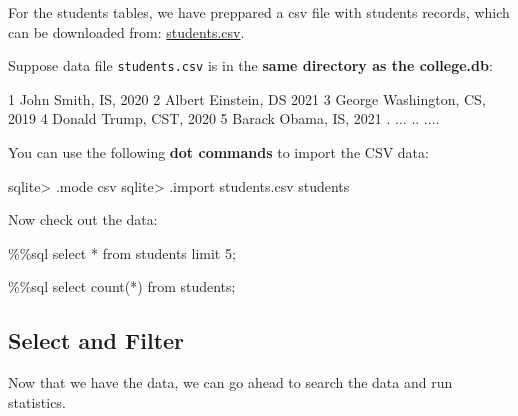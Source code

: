 \documentclass[
  letterpaper,
]{scrbook}
\newenvironment{Shaded}{\begin{snugshade}}{\end{snugshade}}
\newcommand{\DecValTok}[1]{\textcolor[rgb]{0.68,0.00,0.00}{#1}}
\newcommand{\ImportTok}[1]{\textcolor[rgb]{0.00,0.46,0.62}{#1}}
\newcommand{\NormalTok}[1]{\textcolor[rgb]{0.00,0.23,0.31}{#1}}
\newcommand{\OperatorTok}[1]{\textcolor[rgb]{0.37,0.37,0.37}{#1}}
\begin{document}
For the students tables, we have preppared a csv file with students
records, which can be downloaded from:
\href{data/students.csv}{students.csv}.

Suppose data file \texttt{students.csv} is in the \textbf{same directory
as the college.db}:

\begin{Shaded}
\begin{Highlighting}[]
\NormalTok{1   John Smith,        IS,  2020}
\NormalTok{2   Albert Einstein,   DS   2021}
\NormalTok{3   George Washington, CS,  2019}
\NormalTok{4   Donald Trump,      CST, 2020}
\NormalTok{5   Barack Obama,      IS,  2021}
\NormalTok{.   ...                ..   ....}
\end{Highlighting}
\end{Shaded}

You can use the following \textbf{dot commands} to import the CSV data:

\begin{Shaded}
\begin{Highlighting}[]
\NormalTok{sqlite\textgreater{} .mode csv}
\NormalTok{sqlite\textgreater{} .import students.csv students}
\end{Highlighting}
\end{Shaded}

Now check out the data:

\begin{Shaded}
\begin{Highlighting}[]
\OperatorTok{\%\%}\NormalTok{sql}
\NormalTok{select }\OperatorTok{*} \ImportTok{from}\NormalTok{ students limit }\DecValTok{5}\OperatorTok{;}
\end{Highlighting}
\end{Shaded}

\begin{Shaded}
\begin{Highlighting}[]
\OperatorTok{\%\%}\NormalTok{sql}
\NormalTok{select count(}\OperatorTok{*}\NormalTok{) }\ImportTok{from}\NormalTok{ students}\OperatorTok{;}
\end{Highlighting}
\end{Shaded}

\subsection*{Select and Filter}\label{select-and-filter}

Now that we have the data, we can go ahead to search the data and run
statistics.
\end{document}
